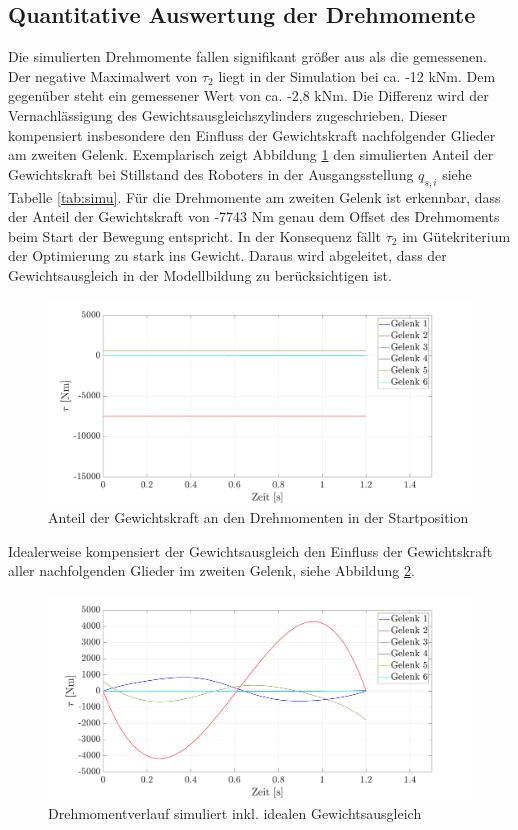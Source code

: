 \subsection*{Quantitative Auswertung der Drehmomente}
Die simulierten Drehmomente fallen signifikant größer aus als die gemessenen. Der negative Maximalwert von $\tau_2$ liegt in der Simulation bei ca. -12 kNm. Dem gegenüber steht ein gemessener Wert  von ca. -2,8 kNm. Die Differenz wird der Vernachlässigung des Gewichtsausgleichszylinders zugeschrieben. Dieser kompensiert insbesondere den Einfluss der Gewichtskraft nachfolgender Glieder am zweiten Gelenk. Exemplarisch zeigt Abbildung \ref{fig:gewichtskraft} den simulierten Anteil der Gewichtskraft bei Stillstand des Roboters in der Ausgangsstellung $q_{s,i}$ siehe Tabelle \ref{tab:simu}. Für die Drehmomente am zweiten Gelenk ist erkennbar, dass der Anteil der Gewichtskraft von -7743 Nm genau dem  Offset des Drehmoments beim Start der Bewegung entspricht. In der Konsequenz fällt $\tau_2$ im Gütekriterium der Optimierung zu stark ins Gewicht. Daraus wird abgeleitet, dass der Gewichtsausgleich in der Modellbildung zu berücksichtigen ist. 
%
\begin{figure}[tbph]
	\centering
	\includegraphics[width=1\linewidth]{images/Gewichtskraft}
	\caption{Anteil der Gewichtskraft an den Drehmomenten in der Startposition}
	\label{fig:gewichtskraft}
\end{figure}
%
Idealerweise kompensiert der Gewichtsausgleich den Einfluss der Gewichtskraft aller nachfolgenden Glieder im zweiten Gelenk, siehe Abbildung \ref{fig:taumat-fgall}. 
%
\begin{figure}[tbph]
	\centering
	\includegraphics[width=1\linewidth]{images/taumat-fgall}
	\caption{Drehmomentverlauf simuliert inkl. idealen Gewichtsausgleich}
	\label{fig:taumat-fgall}
\end{figure}
